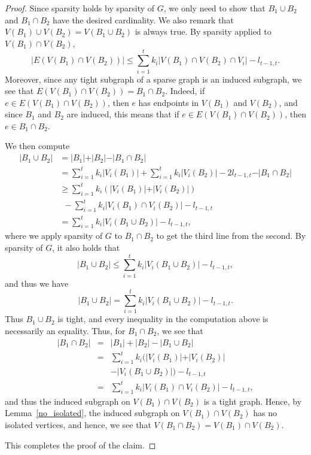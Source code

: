 \documentclass{article}
\begin{document}
\begin{proof}
    Since sparsity holds by sparsity of $G$, we only need to show that $B_1\cup B_2$ and $B_1\cap B_2$ have the desired cardinality. We also remark that $V(B_1) \cup V(B_2) = V(B_1\cup B_2)$ is always true. By sparsity applied to $V(B_1) \cap V(B_2)$,
    \begin{equation*}
        \vert E(V(B_1) \cap V(B_2))\vert \leq \sum_{i=1}^{t} k_i \vert V(B_1)\cap V(B_2)\cap V_i \vert   -l_{t-1, t}.
    \end{equation*}
    Moreover, since any tight subgraph of a sparse graph is an induced subgraph, we see that $E(V(B_1) \cap V(B_2)) = B_1\cap B_2$. Indeed, if $e\in E(V(B_1) \cap V(B_2))$, then $e$ has endpoints in $V(B_1)$ and $V(B_2)$, and since $B_1$ and $B_2$ are induced, this means that if $e\in E(V(B_1) \cap V(B_2))$, then $e\in B_1\cap B_2$. 
    
    We then compute
    $$\begin{array}{cl}
     \vert B_1\cup B_2 \vert &= \vert B_1 \vert + \vert B_2 \vert -  \vert B_1\cap B_2 \vert\\
     &= \sum_{i=1}^{t} k_i\vert V_i(B_1) \vert  + \sum_{i=1}^{t} k_i\vert V_i(B_2) \vert  -2l_{t-1, t} - \vert B_1 \cap B_2 \vert \\
    &\geq \sum_{i=1}^{t} k_i \left( \vert V_i(B_1)\vert+ \vert V_i(B_2)  \vert \right)\\
     & ~~- \sum_{i=1}^{t} k_i \vert V_i(B_1)\cap V_i(B_2)\vert   -l_{t-1, t} \\
     &=\sum_{i=1}^{t} k_i\vert V_i(B_1\cup B_2) \vert  -l_{t-1, t},
\end{array}$$
    where we apply sparsity of $G$ to $B_1\cap B_2$ to get the third line from the second. By sparsity of $G$, it also holds that 
    \begin{equation*}
      \vert  B_1 \cup B_2 \vert \leq \sum_{i=1}^{t} k_i \vert V_i(B_1\cup B_2)\vert -l_{t-1, t},
    \end{equation*}
    and thus we have
    \begin{equation*}
    	  \vert  B_1 \cup B_2 \vert = \sum_{i=1}^{t} k_i \vert V_i(B_1\cup B_2)\vert  -l_{t-1, t}.
    \end{equation*} 
    Thus $B_1 \cup B_2$ is tight, and every inequality in the computation above is necessarily an equality. Thus, for $B_1 \cap B_2$, we see that
    $$\begin{array}{cll}
     \vert B_1\cap B_2 \vert & = & | B_1| +| B_2| - |B_1 \cup B_2| \\ 
    & = &\sum_{i=1}^{t} k_i \big( \vert V_i(B_1) \vert+ \vert V_i(B_2)  \vert \\
    && -\vert V_i(B_1\cup B_2) \vert  \big) -l_{t-1,t} \\
        & = &\sum_{i=1}^{t} k_i\vert V_i(B_1)\cap V_i(B_2)\vert -l_{t-1,t},
    \end{array}$$
 and thus the induced subgraph on $V(B_1) \cap V(B_2)$ is a tight graph. Hence, by Lemma~\ref{no_isolated}, the induced subgraph on $V(B_1) \cap V(B_2)$ has no isolated vertices, and hence, we see that $V(B_1 \cap B_2) = V(B_1)\cap V(B_2)$.

    This completes the proof of the claim.
\end{proof}
\end{document}
